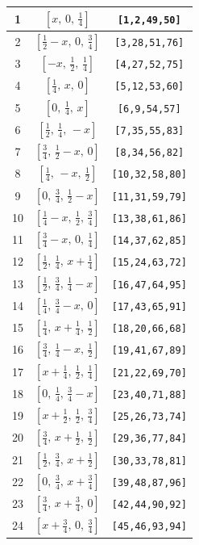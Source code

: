 \documentclass[fleqn,8pt]{jsarticle}
\begin{document}
\begin{longtable}{ccc}
1 & $\left[ x,\, 0,\, \frac{1}{4} \right]$ & {\tt [1,2,49,50]} \\ \hline
2 & $\left[ \frac{1}{2} - x,\, 0,\, \frac{3}{4} \right]$ & {\tt [3,28,51,76]} \\ \hline
3 & $\left[ - x,\, \frac{1}{2},\, \frac{1}{4} \right]$ & {\tt [4,27,52,75]} \\ \hline
4 & $\left[ \frac{1}{4},\, x,\, 0 \right]$ & {\tt [5,12,53,60]} \\ \hline
5 & $\left[ 0,\, \frac{1}{4},\, x \right]$ & {\tt [6,9,54,57]} \\ \hline
6 & $\left[ \frac{1}{2},\, \frac{1}{4},\, - x \right]$ & {\tt [7,35,55,83]} \\ \hline
7 & $\left[ \frac{3}{4},\, \frac{1}{2} - x,\, 0 \right]$ & {\tt [8,34,56,82]} \\ \hline
8 & $\left[ \frac{1}{4},\, - x,\, \frac{1}{2} \right]$ & {\tt [10,32,58,80]} \\ \hline
9 & $\left[ 0,\, \frac{3}{4},\, \frac{1}{2} - x \right]$ & {\tt [11,31,59,79]} \\ \hline
10 & $\left[ \frac{1}{4} - x,\, \frac{1}{2},\, \frac{3}{4} \right]$ & {\tt [13,38,61,86]} \\ \hline
11 & $\left[ \frac{3}{4} - x,\, 0,\, \frac{1}{4} \right]$ & {\tt [14,37,62,85]} \\ \hline
12 & $\left[ \frac{1}{2},\, \frac{1}{4},\, x + \frac{1}{4} \right]$ & {\tt [15,24,63,72]} \\ \hline
13 & $\left[ \frac{1}{2},\, \frac{3}{4},\, \frac{1}{4} - x \right]$ & {\tt [16,47,64,95]} \\ \hline
14 & $\left[ \frac{1}{4},\, \frac{3}{4} - x,\, 0 \right]$ & {\tt [17,43,65,91]} \\ \hline
15 & $\left[ \frac{1}{4},\, x + \frac{1}{4},\, \frac{1}{2} \right]$ & {\tt [18,20,66,68]} \\ \hline
16 & $\left[ \frac{3}{4},\, \frac{1}{4} - x,\, \frac{1}{2} \right]$ & {\tt [19,41,67,89]} \\ \hline
17 & $\left[ x + \frac{1}{4},\, \frac{1}{2},\, \frac{1}{4} \right]$ & {\tt [21,22,69,70]} \\ \hline
18 & $\left[ 0,\, \frac{1}{4},\, \frac{3}{4} - x \right]$ & {\tt [23,40,71,88]} \\ \hline
19 & $\left[ x + \frac{1}{2},\, \frac{1}{2},\, \frac{3}{4} \right]$ & {\tt [25,26,73,74]} \\ \hline
20 & $\left[ \frac{3}{4},\, x + \frac{1}{2},\, \frac{1}{2} \right]$ & {\tt [29,36,77,84]} \\ \hline
21 & $\left[ \frac{1}{2},\, \frac{3}{4},\, x + \frac{1}{2} \right]$ & {\tt [30,33,78,81]} \\ \hline
22 & $\left[ 0,\, \frac{3}{4},\, x + \frac{3}{4} \right]$ & {\tt [39,48,87,96]} \\ \hline
23 & $\left[ \frac{3}{4},\, x + \frac{3}{4},\, 0 \right]$ & {\tt [42,44,90,92]} \\ \hline
24 & $\left[ x + \frac{3}{4},\, 0,\, \frac{3}{4} \right]$ & {\tt [45,46,93,94]} \\
\end{longtable}
\end{document}
